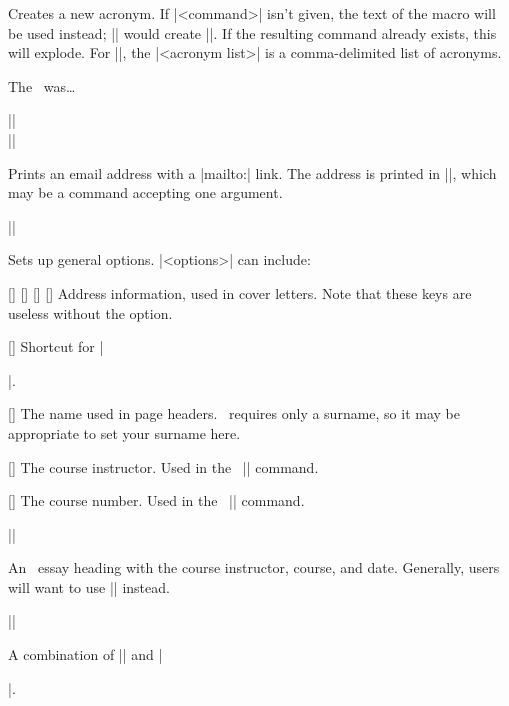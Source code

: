 \documentclass{ltxguidex}
\begin{document}
Creates a new acronym. If |<command>| isn't given, the text of the macro
will be used instead; || would create |\mla|. If the
resulting command already exists, this will explode. For |\newacronyms|, the
|<acronym list>| is a comma-delimited list of acronyms.

\begin{LTXexample}
\xyz

The \ussr\ was\dots
\end{LTXexample}

\begin{desc}
||\\
||
\end{desc}

Prints an email address with a |mailto:| link. The address is printed in
|\emailstyle|, which may be a command accepting one argument.

\begin{desc}
||
\end{desc}

Sets up general options. |<options>| can include:
\begin{keys}
	[]
	[]
	[]
	[]
	Address information, used in cover letters. Note that these keys are
	useless without the  option.

	[]
	Shortcut for |\author{<author>}|.

	[]
	The name used in page headers. \mla\ requires only a surname, so it
	may be appropriate to set your surname here.

	[]
	The course instructor. Used in the \mla\ |\essayintro| command.

	[]
	The course number. Used in the \mla\ |\essayintro| command.
\end{keys}

\begin{desc}
|\heading|
\end{desc}
An \mla\ essay heading with the course instructor, course, and date.
Generally, users will want to use |\essayintro| instead.

\begin{desc}
|\essayintro|
\end{desc}
A combination of |\heading| and |\maketitle|.
\end{document}
